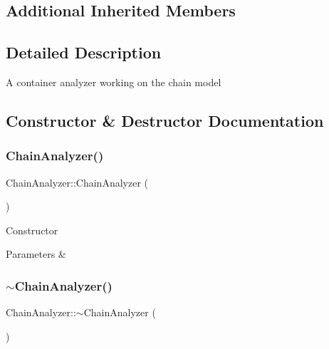 \subsection*{Additional Inherited Members}


\subsection{Detailed Description}
A container analyzer working on the chain model 

\subsection{Constructor \& Destructor Documentation}
\mbox{\label{class_chain_analyzer_a5838d995d24865111ad93c07159eea70}} 
\subsubsection{\texorpdfstring{Chain\+Analyzer()}{ChainAnalyzer()}}
{\footnotesize\ttfamily Chain\+Analyzer\+::\+Chain\+Analyzer (\begin{DoxyParamCaption}{ }\end{DoxyParamCaption})}

Constructor


\begin{DoxyParams}{Parameters}
{\em } & \\
\hline
\end{DoxyParams}
\mbox{\label{class_chain_analyzer_a73079c72ffaf87957854ff6623830d6b}} 
\subsubsection{\texorpdfstring{$\sim$\+Chain\+Analyzer()}{~ChainAnalyzer()}}
{\footnotesize\ttfamily Chain\+Analyzer\+::$\sim$\+Chain\+Analyzer (\begin{DoxyParamCaption}{ }\end{DoxyParamCaption})\hspace{0.3cm}{\ttfamily [default]}}

